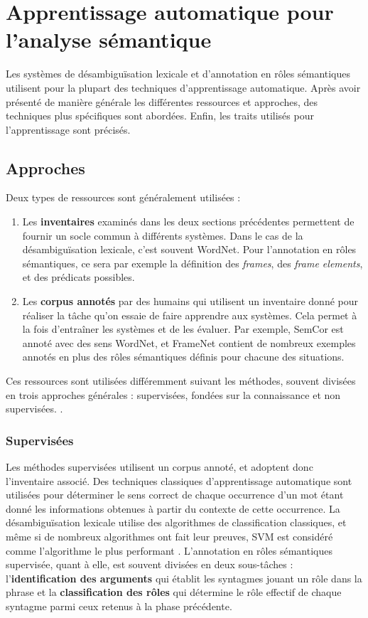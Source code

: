 \section{Apprentissage automatique pour l'analyse sémantique}

Les systèmes de désambiguïsation lexicale et d'annotation en rôles sémantiques utilisent pour la plupart des techniques d'apprentissage automatique. Après avoir présenté de manière générale les différentes ressources et approches, des techniques plus spécifiques sont abordées. Enfin, les traits utilisés pour l'apprentissage sont précisés.

\subsection{Approches}

Deux types de ressources sont généralement utilisées :
\begin{enumerate}
    \item Les \textbf{inventaires} examinés dans les deux sections précédentes permettent de fournir un socle commun à différents systèmes. Dans le cas de la désambiguïsation lexicale, c'est souvent WordNet. Pour l'annotation en rôles sémantiques, ce sera par exemple la définition des \textit{frames}, des \textit{frame elements}, et des prédicats possibles.
    \item Les \textbf{corpus annotés} par des humains qui utilisent un inventaire donné pour réaliser la tâche qu'on essaie de faire apprendre aux systèmes. Cela permet à la fois d'entraîner les systèmes et de les évaluer. Par exemple, SemCor est annoté avec des sens WordNet, et FrameNet contient de nombreux exemples annotés en plus des rôles sémantiques définis pour chacune des situations.
\end{enumerate}

Ces ressources sont utilisées différemment suivant les méthodes, souvent divisées en trois approches générales : supervisées, fondées sur la connaissance et non supervisées. \citep{navigli2009word}.

\subsubsection{Supervisées}

Les méthodes supervisées utilisent un corpus annoté, et adoptent donc l'inventaire associé. Des techniques classiques d'apprentissage automatique sont utilisées pour déterminer le sens correct de chaque occurrence d'un mot étant donné les informations obtenues à partir du contexte de cette occurrence. La désambiguïsation lexicale utilise des algorithmes de classification classiques, et même si de nombreux algorithmes ont fait leur preuves, SVM est considéré comme l'algorithme le plus performant \cite{navigli2012quick}. L'annotation en rôles sémantiques supervisée, quant à elle, est souvent divisées en deux sous-tâches : l'\textbf{identification des arguments} qui établit les syntagmes jouant un rôle dans la phrase et la \textbf{classification des rôles} qui détermine le rôle effectif de chaque syntagme parmi ceux retenus à la phase précédente.

